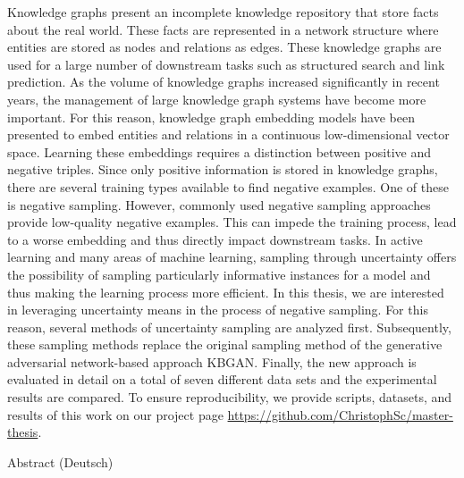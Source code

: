 %
\label{sec:abstract}
%
Knowledge graphs present an incomplete knowledge repository that store facts about the real world.
These facts are represented in a network structure where entities are stored as nodes and relations as edges.
These knowledge graphs are used for a large number of downstream tasks such as structured search and link prediction.
As the volume of knowledge graphs increased significantly in recent years, the management of large knowledge graph systems have become more important.
For this reason, knowledge graph embedding models have been presented to embed entities and relations in a continuous low-dimensional vector space.
Learning these embeddings requires a distinction between positive and negative triples.
Since only positive information is stored in knowledge graphs, there are several training types available to find negative examples.
One of these is negative sampling. 
However, commonly used negative sampling approaches provide low-quality negative examples.
This can impede the training process, lead to a worse embedding and thus directly impact downstream tasks.
In active learning and many areas of machine learning, sampling through uncertainty offers the possibility of sampling particularly informative instances for a model and thus making the learning process more efficient.
In this thesis, we are interested in leveraging uncertainty means in the process of negative sampling.
For this reason, several methods of uncertainty sampling are analyzed first.
Subsequently, these sampling methods replace the original sampling method of the generative adversarial network-based approach KBGAN. 
Finally, the new approach is evaluated in detail on a total of seven different data sets and the experimental results are compared.
To ensure reproducibility, we provide scripts, datasets, and results of this work on our project page \url{https://github.com/ChristophSc/master-thesis}.

\clearpage
{Abstract (Deutsch)}
\label{sec:abstract-german}\\


